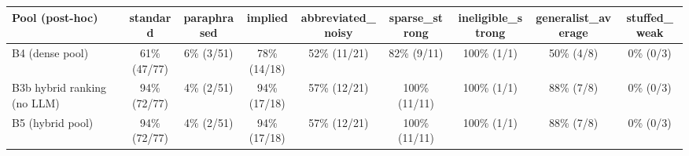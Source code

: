 \begin{tabular}{lcccccccc}
\toprule
Pool (post-hoc) & standard & paraphrased & implied & abbreviated\_noisy & sparse\_strong & ineligible\_strong & generalist\_average & stuffed\_weak \\
\midrule
B4 (dense pool) & 61\% (47/77) & 6\% (3/51) & 78\% (14/18) & 52\% (11/21) & 82\% (9/11) & 100\% (1/1) & 50\% (4/8) & 0\% (0/3) \\
B3b hybrid ranking (no LLM) & 94\% (72/77) & 4\% (2/51) & 94\% (17/18) & 57\% (12/21) & 100\% (11/11) & 100\% (1/1) & 88\% (7/8) & 0\% (0/3) \\
B5 (hybrid pool) & 94\% (72/77) & 4\% (2/51) & 94\% (17/18) & 57\% (12/21) & 100\% (11/11) & 100\% (1/1) & 88\% (7/8) & 0\% (0/3) \\
\bottomrule
\end{tabular}

